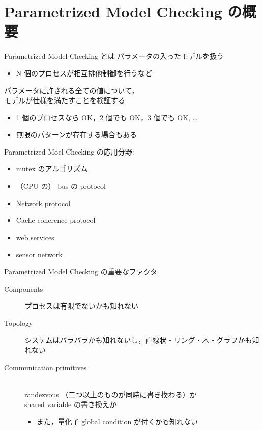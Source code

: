 \documentclass[presentation, xetex]{beamer}
\begin{document}
\section{Parametrized Model Checking の概要}
\label{sec:org7257787}

\begin{frame}[label={sec:org85469bf}]{Parametrized Model Checking とは}
パラメータの入ったモデルを扱う
\begin{itemize}
\item N 個のプロセスが相互排他制御を行うなど
\end{itemize}


パラメータに許される全ての値について，\\
モデルが仕様を満たすことを検証する
\begin{itemize}
\item 1 個のプロセスなら OK，2 個でも OK，3 個でも OK, \ldots{}
\item 無限のパターンが存在する場合もある
\end{itemize}
\end{frame}


\begin{frame}[label={sec:org72b5105}]{Parametrized Moel Checking の応用分野:}
\begin{itemize}
\item mutex のアルゴリズム
\item （CPU の） bus の protocol
\item Network protocol
\item Cache coherence protocol
\item web services
\item sensor network
\end{itemize}
\end{frame}


\begin{frame}[label={sec:org578ffe5}]{Parametrized Model Checking の重要なファクタ}
\begin{description}
\item[{Components}] プロセスは有限でないかも知れない
\item[{Topology}] システムはバラバラかも知れないし，直線状・リング・木・グラフかも知れない
\item[{Communication primitives}] \mbox{}\\
randezvous （二つ以上のものが同時に書き換わる）か\\
shared variable の書き換えか
\begin{itemize}
\item また，量化子 \alert{\alert{global condition}} が付くかも知れない
\end{itemize}
\end{description}
\end{frame}
\end{document}
